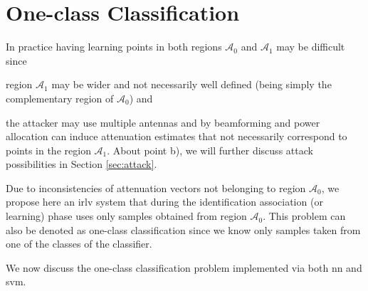 \documentclass[draftcls,onecolumn,12pt]{IEEEtran}
\newcommand{\A}[1]{\mathcal{A}_#1}
\begin{document}

\section{One-class Classification}
\label{sec:OneClass}

In practice having learning points in both regions $\A{0}$ and $\A{1}$ may be difficult since \begin{enumerate*}[label=\alph*)] \item region $\A{1}$ may be wider and not necessarily well defined (being simply the complementary region of $\A{0}$) and \item the attacker may use multiple antennas and by beamforming and power allocation can induce attenuation estimates that not necessarily correspond to points in the region $\A{1}$. About point b), we will further discuss attack possibilities in Section \ref{sec:attack}.

Due to inconsistencies of attenuation vectors not belonging to region $\A{0}$, we propose here an \ac{irlv} system that during the identification association (or learning) phase uses only samples obtained from region $\A{0}$. This problem can also be denoted as one-class classification since we know only samples taken from one of the classes of the classifier. 

We now discuss the one-class classification problem implemented via both \ac{nn} and \ac{svm}.
\end{enumerate*} 
\end{document}
